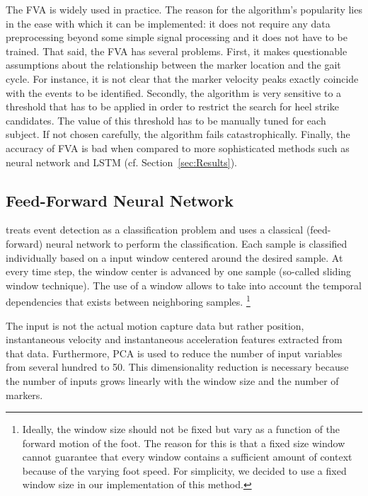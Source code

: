 \documentclass{acm_proc_article-sp}
\begin{document}
The FVA is widely used in practice.
The reason for the algorithm's popularity lies in the ease with which it can be
implemented:
it does not require any data preprocessing beyond some simple signal processing 
and it does not have to be trained.
That said, the FVA has several problems.
First, it makes questionable assumptions about the relationship between the
marker location and the gait cycle.
For instance, it is not clear that the marker velocity peaks exactly coincide
with the events to be identified.
Secondly, the algorithm is very sensitive to a threshold that has to be applied
in order to restrict the search for heel strike candidates.
The value of this threshold has to be manually tuned for each subject.
If not chosen carefully, the algorithm fails catastrophically.
Finally, the accuracy of FVA is bad when compared to more sophisticated methods
such as neural network and LSTM
(cf. Section~\ref{sec:Results}).

\subsection{Feed-Forward Neural Network}
\label{sub:Feed-Forward Neural Network}

\cite{Miller2009}
treats event detection as a classification problem and uses a classical
(feed-forward) neural network to perform the classification.
Each sample is classified individually based on a input window centered around
the desired sample.
At every time step, the window center is advanced by one sample
(so-called sliding window technique).
The use of a window allows to take into account the temporal dependencies
that exists between neighboring samples.%
\footnote
{
    Ideally, the window size should not be fixed but vary as a function of the 
    forward motion of the foot.
    The reason for this is that a fixed size window cannot guarantee that every
    window contains a sufficient amount of context because of the varying foot
    speed.
    For simplicity, we decided to use a fixed window size in our implementation
    of this method.
}

The input is not the actual motion capture data but rather position,
instantaneous velocity and instantaneous acceleration features extracted from
that data.
Furthermore, PCA is used to reduce the number of input variables from several
hundred to 50.
This dimensionality reduction is necessary because the number of inputs grows
linearly with the window size and the number of markers.
\end{document}
